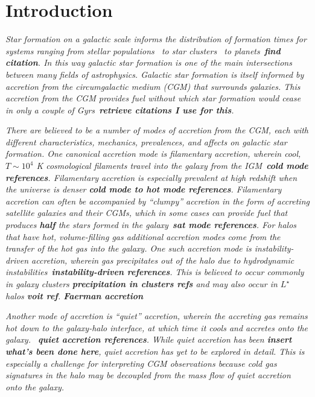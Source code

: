 \documentclass[fleqn,usenatbib]{mnras}
\begin{document}
\section{Introduction}
\label{s: introduction}

\textit{
Star formation on a galactic scale informs the distribution of formation times for systems ranging from stellar populations~\cite{Yu2021} to star clusters~\citep[e.g.][]{Grudic2020} to planets~\textbf{find citation}.
In this way galactic star formation is one of the main intersections between many fields of astrophysics.
Galactic star formation is itself informed by accretion from the circumgalactic medium (CGM) that surrounds galaxies.
This accretion from the CGM provides fuel without which star formation would cease in only a couple of Gyrs~\textbf{retrieve citations I use for this}.
}

\textit{
There are believed to be a number of modes of accretion from the CGM, each with different characteristics, mechanics, prevalences, and affects on galactic star formation.
One canonical accretion mode is filamentary accretion, wherein cool, $T \sim 10^4$ K cosmological filaments travel into the galaxy  from the IGM~\textbf{cold mode references}.
Filamentary accretion is especially prevalent at high redshift when the universe is denser \textbf{cold mode to hot mode references}.
Filamentary accretion can often be accompanied by ``clumpy'' accretion in the form of accreting satellite galaxies and their CGMs, which in some cases can provide fuel that produces \textbf{half} the stars formed in the galaxy~\textbf{sat mode references}.
For halos that have hot, volume-filling gas additional accretion modes come from the transfer of the hot gas into the galaxy.
One such accretion mode is instability-driven accretion, wherein gas precipitates out of the halo due to hydrodynamic instabilities~\textbf{instability-driven references}.
This is believed to occur commonly in galaxy clusters \textbf{precipitation in clusters refs} and may also occur in $L^\star$ halos \textbf{voit ref}.
\textbf{Faerman accretion}
}

\textit{
Another mode of accretion is ``quiet'' accretion, wherein the accreting gas remains hot down to the galaxy-halo interface, at which time it cools and accretes onto the galaxy.
~\textbf{quiet accretion references}. 
While quiet accretion has been \textbf{insert what's been done here}, quiet accretion has yet to be explored in detail.
This is especially a challenge for interpreting CGM observations because cold gas signatures in the halo may be decoupled from the mass flow of quiet accretion onto the galaxy.
}
\end{document}

